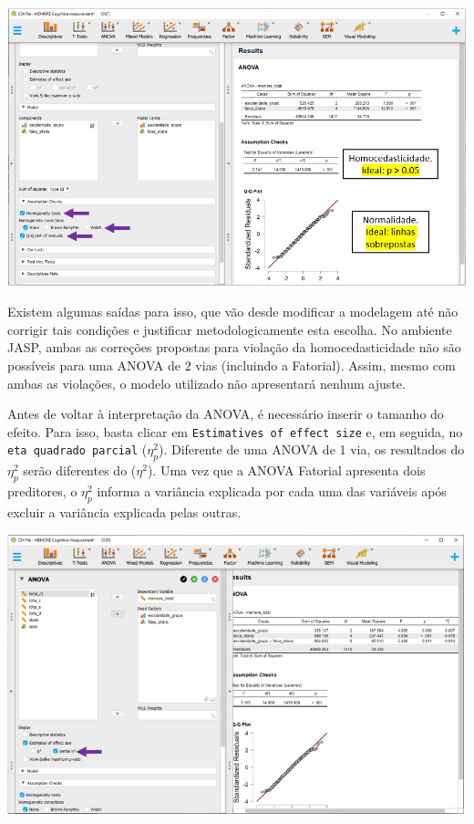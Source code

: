 \documentclass[
]{book}
\begin{document}
\includegraphics{./img/cap_anova_two_way_pressupostos2.png}

Existem algumas saídas para isso, que vão desde modificar a modelagem
até não corrigir tais condições e justificar metodologicamente esta
escolha. No ambiente JASP, ambas as correções propostas para violação da
homocedasticidade não são possíveis para uma ANOVA de 2 vias (incluindo
a Fatorial). Assim, mesmo com ambas as violações, o modelo utilizado não
apresentará nenhum ajuste.

Antes de voltar à interpretação da ANOVA, é necessário inserir o tamanho
do efeito. Para isso, basta clicar em
\texttt{Estimatives\ of\ effect\ size} e, em seguida, no
\texttt{eta\ quadrado\ parcial} (\(η_p^2\)). Diferente de uma ANOVA de 1
via, os resultados do \(η_p^2\) serão diferentes do (\(η^2\)). Uma vez
que a ANOVA Fatorial apresenta dois preditores, o \(η_p^2\) informa a
variância explicada por cada uma das variáveis após excluir a variância
explicada pelas outras.

\includegraphics{./img/cap_anova_fatorial_tamanho_do_efeito.png}
\end{document}
